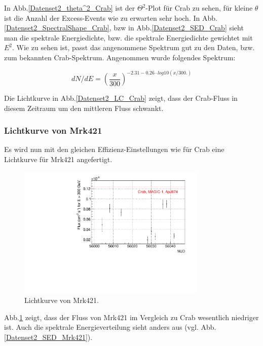 In Abb.\ref{Datenset2_theta^2_Crab} ist der $\Theta^2$-Plot für Crab zu sehen, für kleine $\theta$ ist die Anzahl der Excess-Events wie zu erwarten sehr hoch.
In Abb.\ref{Datenset2_SpectralShape_Crab}, bzw in Abb.\ref{Datenset2_SED_Crab} sieht man die spektrale Energiedichte, bzw. die spektrale Energiedichte gewichtet mit $E^2$.
Wie zu sehen ist, passt das angenommene Spektrum gut zu den Daten, bzw. zum bekannten Crab-Spektrum.
Angenommen wurde folgendes Spektrum:

\begin{equation}
dN/dE=\left(\frac{x}{300}\right)^{-2.31-0.26\cdot log10(x/300.)}
\end{equation}

Die Lichtkurve in Abb.\ref{Datenset2_LC_Crab} zeigt, dass der Crab-Fluss in diesem Zeitraum um den mittleren Fluss schwankt. 

\subsubsection{Lichtkurve von Mrk421}
Es wird nun mit den gleichen Effizienz-Einstellungen wie für Crab eine Lichtkurve für Mrk421 angefertigt.

\begin{figure}
    \centering
    \includegraphics[width=0.8\textwidth]{./Plots/04_MrkAnalyse/Datenset2/LC_Mrk421.pdf}
    \caption{Lichtkurve von Mrk421.}
    \label{Datenset2_LC_Mrk421}
\end{figure}

Abb.\ref{Datenset2_LC_Mrk421} zeigt, dass der Fluss von Mrk421 im Vergleich zu Crab wesentlich niedriger ist.
Auch die spektrale Energieverteilung sieht anders aus (vgl. Abb.\ref{Datenset2_SED_Mrk421}).

